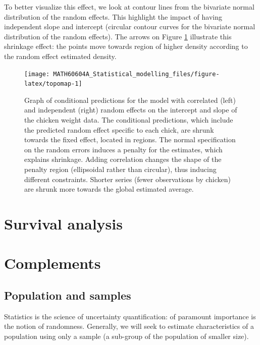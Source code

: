\documentclass[
  11pt,
  letterpaper,
]{book}
\theoremstyle{definition}
\theoremstyle{definition}
\theoremstyle{definition}
\theoremstyle{definition}
\theoremstyle{remark}
\begin{document}
To better visualize this effect, we look at contour lines from the bivariate normal distribution of the random effects. This highlight the impact of having independent slope and intercept (circular contour curves for the bivariate normal distribution of the random effects). The arrows on Figure \ref{fig:topomap} illustrate this shrinkage effect: the points move towards region of higher density according to the random effect estimated density.

\begin{figure}

{\centering \texttt{[image: MATH60604A\_Statistical\_modelling\_files/figure-latex/topomap-1]} 

}

\caption{Graph of conditional predictions for the model with correlated (left) and independent (right) random effects on the intercept and slope of the chicken weight data. The conditional predictions, which include the predicted random effect specific to each chick, are shrunk towards the fixed effect, located in regions. The normal specification on the random errors induces a penalty for the estimates, which explains shrinkage. Adding correlation changes the shape of the penalty region (ellipsoidal rather than circular), thus inducing different constraints. Shorter series (fewer observations by chicken) are shrunk more towards the global estimated average.}\label{fig:topomap}
\end{figure}

\hypertarget{survival}{%
\chapter{Survival analysis}\label{survival}}

\hypertarget{appendix-appendix}{%
\appendix}


\hypertarget{complement}{%
\chapter{Complements}\label{complement}}

\hypertarget{population-sample}{%
\section{Population and samples}\label{population-sample}}

Statistics is the science of uncertainty quantification: of paramount importance is the notion of randomness. Generally, we will seek to estimate characteristics of a population using only a sample (a sub-group of the population of smaller size).
\end{document}
